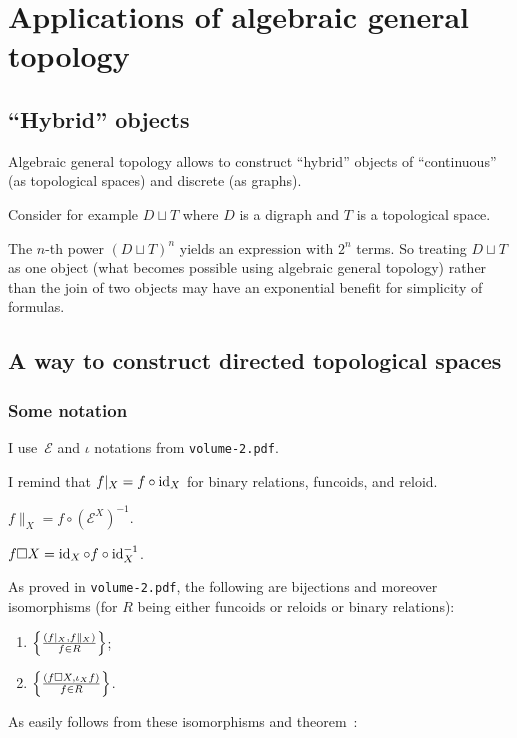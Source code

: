\chapter{Applications of algebraic general topology}

\section{``Hybrid'' objects}

Algebraic general topology allows to construct ``hybrid'' objects of ``continuous'' (as topological spaces)
and discrete (as graphs).

Consider for example $D\sqcup T$ where $D$ is a digraph and $T$ is a topological space.

The $n$-th power $(D\sqcup T)^n$ yields an expression with $2^n$ terms.
So treating $D\sqcup T$ as one object (what becomes possible using algebraic general topology)
rather than the join of two objects may have an exponential benefit for simplicity of formulas.

\section{A way to construct directed topological spaces}

\subsection{Some notation}

I use~$\mathcal{E}$ and $\iota$ notations from {\tt volume-2.pdf}. 

I remind that $f|_X = f\circ \operatorname{id}_X$ for binary relations, funcoids, and reloid.

$f\parallel_X = f\circ(\mathcal{E}^X)^{-1}$.

$f\square X = \operatorname{id}_X\circ f\circ\operatorname{id}_X^{-1}$.

As proved in {\tt volume-2.pdf}, the following are bijections and moreover isomorphisms (for $R$ being either funcoids or reloids or binary relations):
\begin{enumerate}
\item $\left\{ \frac{(f|_X,f\parallel_X)}{f\in R}\right\}$;
\item $\left\{ \frac{(f\square X,\iota_X f)}{f\in R}\right\}$.
\end{enumerate}

As easily follows from these isomorphisms and theorem~:

